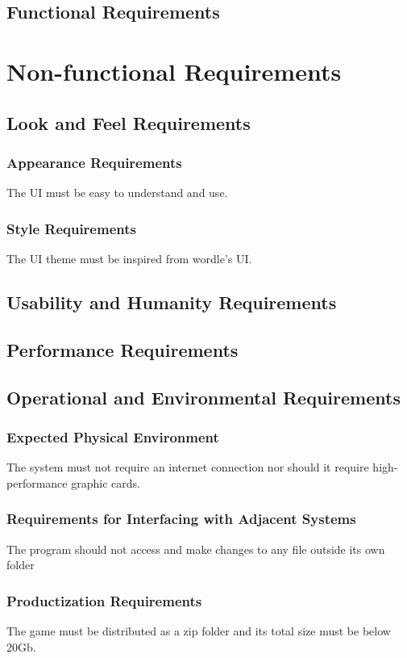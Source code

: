 \documentclass[12pt, titlepage]{article}
\begin{document}
\subsection{Functional Requirements}

\section{Non-functional Requirements}

\subsection{Look and Feel Requirements}
\subsubsection{Appearance Requirements}
The UI must be easy to understand and use.

\subsubsection{Style Requirements}
The UI theme must be inspired from wordle's UI.

\subsection{Usability and Humanity Requirements}

\subsection{Performance Requirements}

\subsection{Operational and Environmental Requirements}
\subsubsection{Expected Physical Environment}
The system must not require an internet connection nor should it require high-performance graphic cards.
\subsubsection{Requirements for Interfacing with Adjacent Systems}
The program should not access and make changes to any file outside its own folder
\subsubsection{Productization Requirements}
The game must be distributed as a zip folder and its total size must be below 20Gb.
\end{document}
